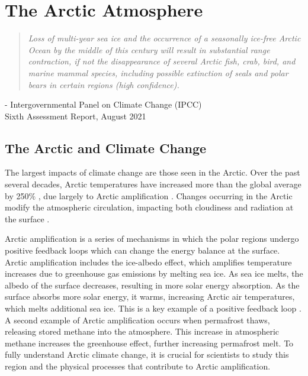 \chapter{The Arctic Atmosphere}
\vspace{1 cm}
\begin{spacing}{1} \begin{quote} 
\noindent \emph{Loss of multi-year sea ice and the occurrence of a seasonally ice-free Arctic Ocean by the middle of this century will result in substantial range contraction, if not the disappearance of several Arctic fish, crab, bird, and marine mammal species, including possible extinction of seals and polar bears in certain regions (high confidence).} \end{quote}
\hspace{6 cm} - Intergovernmental Panel on Climate Change (IPCC) \\
\hspace*{6.7 cm} Sixth Assessment Report, August 2021  
\end{spacing}
\doublespacing
\section{The Arctic and Climate Change}
The largest impacts of climate change are those seen in the Arctic. Over the past several decades, Arctic temperatures have increased more than the global average by 250$\%$ \citep{tjernstrom:2014a}, due largely to Arctic amplification \citep{rantanen:2022}. Changes occurring in the Arctic modify the atmospheric circulation, impacting both cloudiness and radiation at the surface \citep{zhang:2008}.
 
Arctic amplification is a series of mechanisms in which the polar regions undergo positive feedback loops which can change the energy balance at the surface. Arctic amplification includes the ice-albedo effect, which amplifies temperature increases due to greenhouse gas emissions by melting sea ice. As sea ice melts, the albedo of the surface decreases, resulting in more solar energy absorption. As the surface absorbs more solar energy, it warms, increasing Arctic air temperatures, which melts additional sea ice. This is a key example of a positive feedback loop \citep{ipcc_techsum}. A second example of Arctic amplification occurs when permafrost thaws, releasing stored methane into the atmosphere. This increase in atmospheric methane increases the greenhouse effect, further increasing permafrost melt. To fully understand Arctic climate change, it is crucial for scientists to study this region and the physical processes that contribute to Arctic amplification.

